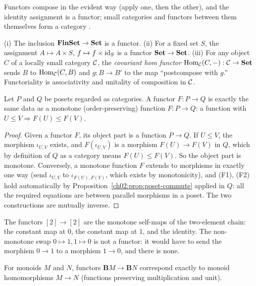 Functors compose in the evident way (apply one, then the other), and the
identity assignment is a functor; small categories and functors between
them themselves form a category \cite{maclanecwm}.

\begin{example}\label{ch02:ex:functors-basic}
(i) The inclusion $\mathbf{FinSet} \to \mathbf{Set}$ is a functor. (ii) For a
fixed set $S$, the assignment $A \mapsto A \times S$,
$f \mapsto f \times \mathrm{id}_S$ is a functor $\mathbf{Set} \to \mathbf{Set}$. (iii) For any
object $C$ of a locally small category $\mathcal{C}$, the \emph{covariant hom
functor} $\mathrm{Hom}_{\mathcal{C}}(C, -) : \mathcal{C} \to \mathbf{Set}$ sends $B$ to
$\mathrm{Hom}_{\mathcal{C}}(C, B)$ and $g : B \to B'$ to the map ``postcompose with
$g$.'' Functoriality is associativity and unitality of composition in
$\mathcal{C}$.
\end{example}

\begin{proposition}\label{ch02:prop:functor-monotone}
Let $P$ and $Q$ be posets regarded as categories. A functor
$F : P \to Q$ is exactly the same data as a monotone (order-preserving)
function $F : P \to Q$: a function with $U \le V \Rightarrow
F(U) \le F(V)$.
\end{proposition}

\begin{proof}
Given a functor $F$, its object part is a function $P \to Q$. If
$U \le V$, the morphism $\iota_{U,V}$ exists, and $F(\iota_{U,V})$ is a
morphism $F(U) \to F(V)$ in $Q$, which by definition of $Q$ as a category
means $F(U) \le F(V)$. So the object part is monotone. Conversely, a
monotone function $F$ extends to morphisms in exactly one way (send
$\iota_{U,V}$ to $\iota_{F(U), F(V)}$, which exists by monotonicity), and
(F1), (F2) hold automatically by
Proposition~\ref{ch02:prop:poset-commute} applied in $Q$: all the
required equations are between parallel morphisms in a poset. The two
constructions are mutually inverse.
\end{proof}

\begin{example}\label{ch02:ex:functors-two-chain}
The functors $[2] \to [2]$ are the monotone self-maps of the two-element
chain: the constant map at $0$, the constant map at $1$, and the
identity. The non-monotone swap $0 \mapsto 1, 1 \mapsto 0$ is not a
functor: it would have to send the morphism $0 \to 1$ to a morphism
$1 \to 0$, and there is none.
\end{example}

\begin{proposition}\label{ch02:prop:functor-monoid}
For monoids $M$ and $N$, functors $\mathbf{B}M \to \mathbf{B}N$
correspond exactly to monoid homomorphisms $M \to N$ (functions
preserving multiplication and unit).
\end{proposition}

